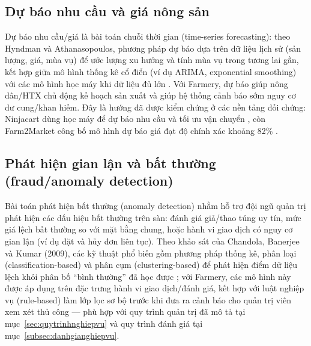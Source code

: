 \subsection{Dự báo nhu cầu và giá nông sản}
Dự báo nhu cầu/giá là bài toán chuỗi thời gian (time-series forecasting): theo Hyndman và Athanasopoulos, phương pháp dự báo dựa trên dữ liệu lịch sử (sản lượng, giá, mùa vụ) để ước lượng xu hướng và tính mùa vụ trong tương lai gần, kết hợp giữa mô hình thống kê cổ điển (ví dụ ARIMA, exponential smoothing) với các mô hình học máy khi dữ liệu đủ lớn \cite{hyndman2021forecasting}. Với Farmery, dự báo giúp nông dân/HTX chủ động kế hoạch sản xuất và giúp hệ thống cảnh báo sớm nguy cơ dư cung/khan hiếm. Đây là hướng đã được kiểm chứng ở các nền tảng đối chứng: Ninjacart dùng học máy để dự báo nhu cầu và tối ưu vận chuyển \cite{ninjacart}, còn Farm2Market công bố mô hình dự báo giá đạt độ chính xác khoảng 82\% \cite{farm2market_2025}.

\subsection{Phát hiện gian lận và bất thường (fraud/anomaly detection)}
Bài toán phát hiện bất thường (anomaly detection) nhằm hỗ trợ đội ngũ quản trị phát hiện các dấu hiệu bất thường trên sàn: đánh giá giả/thao túng uy tín, mức giá lệch bất thường so với mặt bằng chung, hoặc hành vi giao dịch có nguy cơ gian lận (ví dụ đặt và hủy đơn liên tục). Theo khảo sát của Chandola, Banerjee và Kumar (2009), các kỹ thuật phổ biến gồm phương pháp thống kê, phân loại (classification-based) và phân cụm (clustering-based) để phát hiện điểm dữ liệu lệch khỏi phân bố ``bình thường'' đã học được \cite{chandola2009anomaly}; với Farmery, các mô hình này được áp dụng trên đặc trưng hành vi giao dịch/đánh giá, kết hợp với luật nghiệp vụ (rule-based) làm lớp lọc sơ bộ trước khi đưa ra cảnh báo cho quản trị viên xem xét thủ công --- phù hợp với quy trình quản trị đã mô tả tại mục~\ref{sec:quytrinhnghiepvu} và quy trình đánh giá tại mục~\ref{subsec:danhgianghiepvu}.

